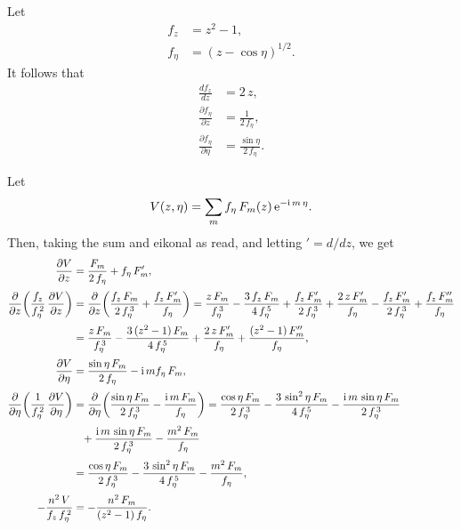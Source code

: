 \documentclass[12pt,prb,aps,notitlepage]{revtex4-1}
\begin{document}
Let
\begin{align}
f_z &= z^2-1,\\[0.5ex]
f_\eta &= (z-\cos\eta)^{1/2}.
\end{align}
It follows that
\begin{align}
\frac{df_z}{dz} &= 2\,z,\\[0.5ex]
\frac{\partial f_\eta}{\partial z}&= \frac{1}{2\,f_\eta},\\[0.5ex]
\frac{\partial f_\eta}{\partial\eta} &= \frac{\sin\eta}{2\,f_\eta}.
\end{align}

Let
\begin{equation}
V(z,\eta)= \sum_m f_\eta\,F_m(z)\,{\rm e}^{-{\rm i}\,m\,\eta}.
\end{equation}
Then, taking the sum and eikonal as read, and letting $'=d/dz$, we get 
\begin{align}
\frac{\partial V}{\partial z} &=\frac{F_m}{2\,f_\eta} + f_\eta\,F_m',\\[0.5ex]
\frac{\partial}{\partial z}\!\left(\frac{f_z}{f_\eta^{\,2}}\,\frac{\partial V}{\partial z}\right)&=
\frac{\partial}{\partial z}\!\left(\frac{f_z\,F_m}{2\,f_\eta^{\,3}}+ \frac{f_z\,F_m'}{f_\eta}\right)
= \frac{z\,F_m}{f_\eta^{\,3}} -\frac{3\,f_z\,F_m}{4\,f_\eta^{\,5}}+\frac{f_z\,F_m'}{2\,f_\eta^{\,3}}
+\frac{2\,z\,F_m'}{f_\eta}- \frac{f_z\,F_m'}{2\,f_\eta^{\,3}}
+\frac{f_z\,F_m''}{f_\eta}\nonumber\\[0.5ex]
&=\frac{z\,F_m}{f_\eta^{\,3}} -\frac{3\,(z^2-1)\,F_m}{4\,f_\eta^{\,5}}
+\frac{2\,z\,F_m'}{f_\eta}
+\frac{(z^2-1)\,F_m''}{f_\eta},\\[0.5ex]
\frac{\partial V}{\partial \eta} &=\frac{\sin\eta\,F_m}{2\,f_\eta} -{\rm i}\,m f_\eta\,F_m,\\[0.5ex]
\frac{\partial}{\partial \eta}\!\left(\frac{1}{f_\eta^{\,2}}\,\frac{\partial V}{\partial \eta}\right)&=
\frac{\partial}{\partial \eta}\!\left(\frac{\sin\eta\,F_m}{2\,f_\eta^{\,3}}-\frac{{\rm i}\,m\,F_m}{f_\eta}\right)=
\frac{\cos\eta\,F_m}{2\,f_\eta^{\,3}}- \frac{3\,\sin^2\eta\,F_m}{4\,f_\eta^{\,5}}-\frac{{\rm i}\,m\,\sin\eta\,F_m}{2\,f_\eta^{\,3}}\nonumber\\[0.5ex]
&\phantom{=} + \frac{{\rm i}\,m\,\sin\eta\,F_m}{2\,f_\eta^{\,3}} - \frac{m^2\,F_m}{f_\eta}\nonumber\\[0.5ex]
&=\frac{\cos\eta\,F_m}{2\,f_\eta^{\,3}}- \frac{3\,\sin^2\eta\,F_m}{4\,f_\eta^{\,5}} - \frac{m^2\,F_m}{f_\eta},\\[0.5ex]
-\frac{n^2\,V}{f_z\,f_\eta^{\,2}}&= -\frac{n^2\,F_m}{(z^2-1)\,f_\eta}.
\end{align}
\end{document}
